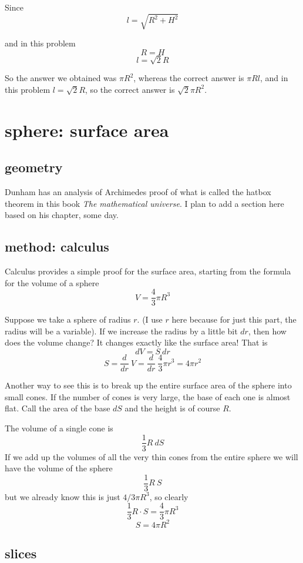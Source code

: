 \documentclass[11pt, oneside]{report}   	%
\begin{document}
Since 
\[ l = \sqrt{R^2 + H^2} \]

and in this problem
\[ R = H \]
\[ l = \sqrt{2} R \]

So the answer we obtained was $\pi R^2$, whereas the correct answer is $\pi R l$, and in this problem $l =  \sqrt{2} R$, so the correct answer is $\sqrt{2} \pi R^2$.

\section*{sphere:  surface area}
\subsection*{geometry}
Dunham has an analysis of Archimedes proof of what is called the hatbox theorem in this book \emph{The mathematical universe}.  I plan to add a section here based on his chapter, some day.

\subsection*{method: calculus}

Calculus provides a simple proof for the surface area, starting from the formula for the volume of a sphere
\[ V= \frac{4}{3} \pi R^3 \]

Suppose we take a sphere of radius $r$.  (I use $r$ here because for just this part, the radius will be a variable).  If we increase the radius by a little bit $dr$, then how does the volume change?  It changes exactly like the surface area!  That is
\[ dV = S \ dr \]
\[ S = \frac{d}{dr} \ V = \frac{d}{dr} \ \frac{4}{3} \pi r^3 = 4 \pi r^2 \]

Another way to see this is to break up the entire surface area of the sphere into small cones.  If the number of cones is very large, the base of each one is almost flat.  Call the area of the base $dS$ and the height is  of course $R$.  

The volume of a single cone is
\[ \frac{1}{3} R \ dS \]
If we add up the volumes of all the very thin cones from the entire sphere we will have the volume of the sphere
\[ \frac{1}{3}R \ S \]
but we already know this is just $4/3 \pi R^3$,
so clearly
\[ \frac{1}{3} R \cdot S = \frac{4}{3}\pi R^3 \]
\[ S = 4 \pi R^2 \]

\subsection*{slices}
\end{document}

